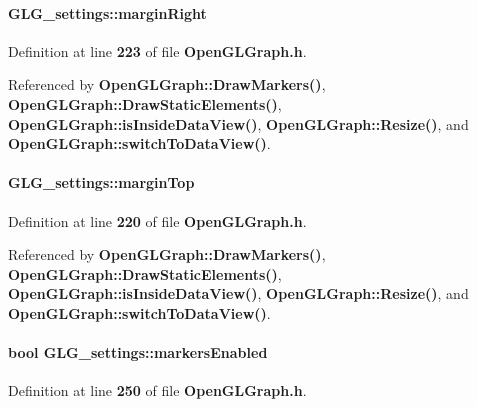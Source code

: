 \paragraph[{margin\+Right}]{ G\+L\+G\+\_\+settings\+::margin\+Right}\label{structGLG__settings_a2ebc2f61be52a9fe3ed8bcf0cff10a3a}


Definition at line {\bf 223} of file {\bf Open\+G\+L\+Graph.\+h}.



Referenced by {\bf Open\+G\+L\+Graph\+::\+Draw\+Markers()}, {\bf Open\+G\+L\+Graph\+::\+Draw\+Static\+Elements()}, {\bf Open\+G\+L\+Graph\+::is\+Inside\+Data\+View()}, {\bf Open\+G\+L\+Graph\+::\+Resize()}, and {\bf Open\+G\+L\+Graph\+::switch\+To\+Data\+View()}.

\paragraph[{margin\+Top}]{ G\+L\+G\+\_\+settings\+::margin\+Top}\label{structGLG__settings_a3d4418a5b30ca463c47dcedfa998754c}


Definition at line {\bf 220} of file {\bf Open\+G\+L\+Graph.\+h}.



Referenced by {\bf Open\+G\+L\+Graph\+::\+Draw\+Markers()}, {\bf Open\+G\+L\+Graph\+::\+Draw\+Static\+Elements()}, {\bf Open\+G\+L\+Graph\+::is\+Inside\+Data\+View()}, {\bf Open\+G\+L\+Graph\+::\+Resize()}, and {\bf Open\+G\+L\+Graph\+::switch\+To\+Data\+View()}.

\paragraph[{markers\+Enabled}]{\setlength{\rightskip}{0pt plus 5cm}bool G\+L\+G\+\_\+settings\+::markers\+Enabled}\label{structGLG__settings_a81b22f08aef5a2902d615dba91d2c170}


Definition at line {\bf 250} of file {\bf Open\+G\+L\+Graph.\+h}.



